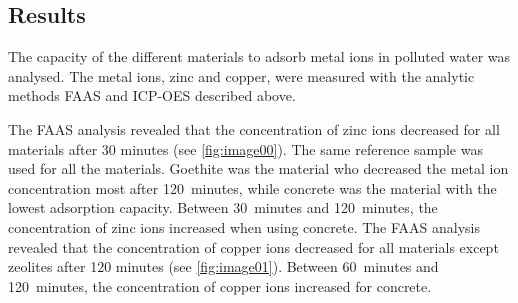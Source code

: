


\subsection{Results}
The capacity of the different materials to adsorb metal ions in polluted water was analysed. The metal ions, zinc and copper, were measured with the analytic methods FAAS and ICP-OES described above.

The FAAS analysis revealed that the concentration of zinc ions decreased for all materials after 30 minutes (see \cref{fig:image00}). The same reference sample was used for all the materials. Goethite was the material who decreased the metal ion concentration most after 120~minutes, while concrete was the material with the lowest adsorption capacity. Between 30~minutes and 120~minutes, the concentration of zinc ions increased when using concrete. The FAAS analysis revealed that the concentration of copper ions decreased for all materials except zeolites after 120 minutes (see \cref{fig:image01}). Between 60~minutes and 120~minutes, the concentration of copper ions increased for concrete.

